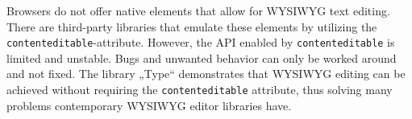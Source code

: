 % 
% 
%
Browsers do not offer native elements that allow for WYSIWYG text editing. There are third-party libraries that emulate these elements by utilizing the \texttt{contenteditable}-attribute. However, the API enabled by \texttt{contenteditable} is limited and unstable. Bugs and unwanted behavior can only be worked around and not fixed. The library „Type“ demonstrates that WYSIWYG editing can be achieved without requiring the \texttt{contenteditable} attribute, thus solving many problems contemporary WYSIWYG editor libraries have.
